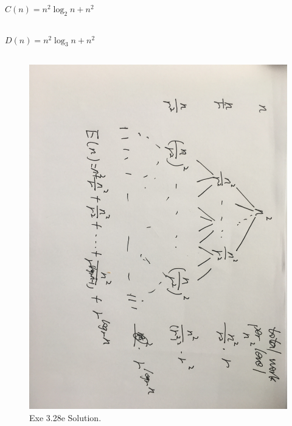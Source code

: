 \subsection{}
$C(n) = n^2{\log_2 n}+n^2$

\subsection{}
$D(n) = n^2{\log_3 n}+n^2$ 

\subsection{}
\begin{figure}[H]
  \includegraphics[width=\linewidth]{EX28e.jpeg}
  \caption{Exe 3.28e Solution.}
  \label{fig:solution 3.28e}
\end{figure}

